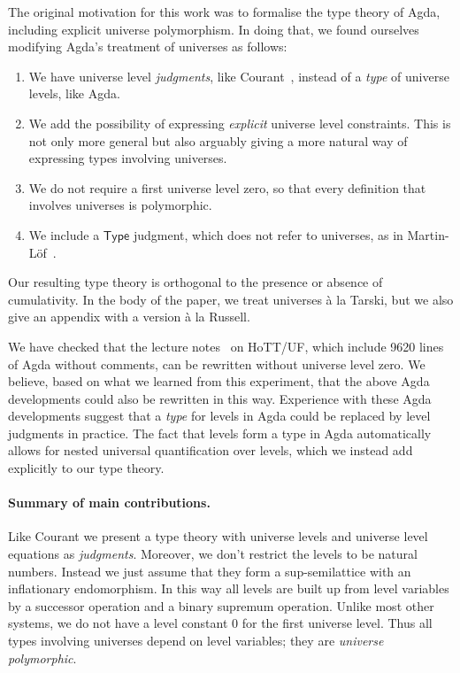 \documentclass[a4paper,UKenglish,cleveref, autoref, thm-restate]{lipics-v2021}
\newcommand{\Type}{\mathsf{Type}}
\begin{document}
The original motivation for this work was to formalise the type theory of Agda, including explicit universe polymorphism. In doing that, we found ourselves modifying Agda's treatment of universes as follows:
\begin{enumerate}
\item We have universe level \emph{judgments}, like Courant~\cite{Courant02}, instead of a \emph{type} of universe levels, like Agda.

 \item We add the possibility of expressing \emph{explicit} universe level constraints. This is not only more general but also arguably giving a more natural way of expressing types involving universes.

 \item We do not require a first universe level zero, so that every definition that involves universes is polymorphic.

 \item We include a $\Type$ judgment, which does not refer to universes, as in Martin-L\"of~\cite{martinlof:hannover}.


\end{enumerate}

Our resulting type theory is orthogonal to the presence or absence of cumulativity. In the body of the paper, we treat universes \`a la Tarski, but we also give an appendix with a version \`a la Russell.


We have checked that the lecture notes~\cite{hott:uf:in:agda} on HoTT/UF, which include 9620 lines of Agda without comments, can be rewritten without universe level zero. We believe, based on what we learned from this experiment, that the above Agda developments could also be rewritten in this way. Experience with these Agda developments suggest that a \emph{type} for levels in Agda could be replaced by level judgments in practice. The fact that levels form a type in Agda automatically allows for nested universal quantification over levels, which we instead add explicitly to our type theory.

\paragraph{Summary of main contributions.}
Like Courant we present a type theory with
universe levels  and universe level equations as \emph{judgments}. Moreover, we don't restrict the levels to be natural numbers. Instead we just assume that they form a sup-semilattice with an inflationary endomorphism. In this way all levels are built up from level variables by a successor operation and a binary supremum operation. Unlike most other systems, we do not have a level constant $0$ for the first universe level. Thus all types involving universes depend on level variables; they are {\em universe polymorphic}.
\end{document}
